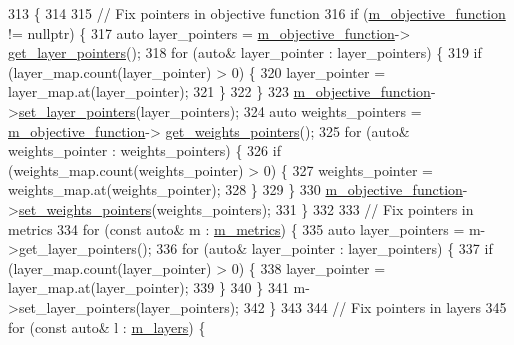 \begin{DoxyCode}
313                                                                                      \{
314 
315   \textcolor{comment}{// Fix pointers in objective function}
316   \textcolor{keywordflow}{if} (\hyperlink{classlbann_1_1model_a24c50e7108dd7698671aed7df5b22e8b}{m\_objective\_function} != \textcolor{keyword}{nullptr}) \{
317     \textcolor{keyword}{auto} layer\_pointers = \hyperlink{classlbann_1_1model_a24c50e7108dd7698671aed7df5b22e8b}{m\_objective\_function}->
      \hyperlink{classlbann_1_1objective__function_a1055da2236a7faf79c5a2632f8dfc683}{get\_layer\_pointers}();
318     \textcolor{keywordflow}{for} (\textcolor{keyword}{auto}& layer\_pointer : layer\_pointers) \{
319       \textcolor{keywordflow}{if} (layer\_map.count(layer\_pointer) > 0) \{
320         layer\_pointer = layer\_map.at(layer\_pointer);
321       \}
322     \}
323     \hyperlink{classlbann_1_1model_a24c50e7108dd7698671aed7df5b22e8b}{m\_objective\_function}->\hyperlink{classlbann_1_1objective__function_a0f934e078b55528dd0ec1ec8ad34c73b}{set\_layer\_pointers}(layer\_pointers);
324     \textcolor{keyword}{auto} weights\_pointers = \hyperlink{classlbann_1_1model_a24c50e7108dd7698671aed7df5b22e8b}{m\_objective\_function}->
      \hyperlink{classlbann_1_1objective__function_a8e37f76e42f6f341ea3592001b3794e5}{get\_weights\_pointers}();
325     \textcolor{keywordflow}{for} (\textcolor{keyword}{auto}& weights\_pointer : weights\_pointers) \{
326       \textcolor{keywordflow}{if} (weights\_map.count(weights\_pointer) > 0) \{
327         weights\_pointer = weights\_map.at(weights\_pointer);
328       \}
329     \}
330     \hyperlink{classlbann_1_1model_a24c50e7108dd7698671aed7df5b22e8b}{m\_objective\_function}->\hyperlink{classlbann_1_1objective__function_a9c3211354ca1cee8a7ba219f4e56e03c}{set\_weights\_pointers}(weights\_pointers);
331   \}
332 
333   \textcolor{comment}{// Fix pointers in metrics}
334   \textcolor{keywordflow}{for} (\textcolor{keyword}{const} \textcolor{keyword}{auto}& m : \hyperlink{classlbann_1_1model_ae75c9aafe9e5a93980cc1bbae986bc79}{m\_metrics}) \{
335     \textcolor{keyword}{auto} layer\_pointers = m->get\_layer\_pointers();
336     \textcolor{keywordflow}{for} (\textcolor{keyword}{auto}& layer\_pointer : layer\_pointers) \{
337       \textcolor{keywordflow}{if} (layer\_map.count(layer\_pointer) > 0) \{
338         layer\_pointer = layer\_map.at(layer\_pointer);
339       \}
340     \}
341     m->set\_layer\_pointers(layer\_pointers);
342   \}
343 
344   \textcolor{comment}{// Fix pointers in layers}
345   \textcolor{keywordflow}{for} (\textcolor{keyword}{const} \textcolor{keyword}{auto}& l : \hyperlink{classlbann_1_1model_a0229fc226ec163d1411548446104569d}{m\_layers}) \{

\end{DoxyCode}
